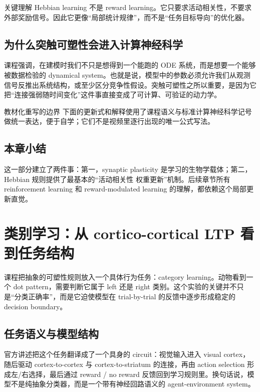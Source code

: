 \documentclass[a4paper]{article}
\begin{document}
\begin{knowledgebox}{关键理解}
Hebbian learning 不是 reward learning。它只要求活动相关性，不要求外部奖励信号。因此它更像“局部统计规律”，而不是“任务目标导向”的优化器。
\end{knowledgebox}

\subsection{为什么突触可塑性会进入计算神经科学}
课程强调，在建模时我们不只是想得到一个能跑的 ODE 系统，而是想要一个能够被数据检验的 dynamical system。也就是说，模型中的参数必须允许我们从观测信号反推出系统结构，或至少区分竞争性假设。突触可塑性之所以重要，是因为它把“连接强弱随时间变化”这件事直接变成了可计算、可验证的动力学。

\begin{warningbox}{教材化重写的边界}
下面的更新式和解释使用了课程语义与标准计算神经科学记号做统一表达，便于自学；它们不是视频里逐行出现的唯一公式写法。
\end{warningbox}

\subsection{本章小结}
这一部分建立了两件事：第一，synaptic plasticity 是学习的生物学载体；第二，Hebbian 规则提供了最基本的“活动相关性 \textrightarrow{} 权重更新”机制。后续章节所有 reinforcement learning 和 reward-modulated learning 的理解，都依赖这个局部更新直觉。

\section{类别学习：从 cortico-cortical LTP 看到任务结构}
课程把抽象的可塑性规则放入一个具体行为任务：category learning。动物看到一个 dot pattern，需要判断它属于 left 还是 right 类别。这个实验的关键并不只是“分类正确率”，而是它迫使模型在 trial-by-trial 的反馈中逐步形成稳定的 decision boundary。

\subsection{任务语义与模型结构}
官方讲述把这个任务翻译成了一个具身的 circuit：视觉输入进入 visual cortex，随后驱动 cortex-to-cortex 与 cortex-to-striatum 的连接，再由 action selection 形成左/右选择，最后通过 reward / no reward 反馈回到学习规则里。换句话说，模型不是纯抽象分类器，而是一个带有神经回路语义的 agent-environment system。
\end{document}
